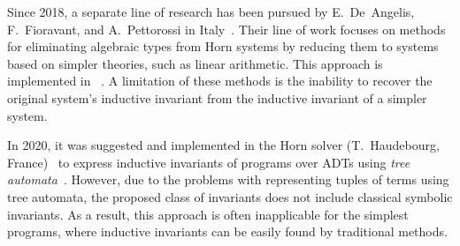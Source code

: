Since 2018, a separate line of research has been pursued by E.~De~Angelis, F.~Fioravant, and A.~Pettorossi in Italy~\cite{10.1093/logcom/exab090,pettorossi_proietti_2022,10.1007/978-3-030-51074-9_6,angelis_fioravanti_pettorossi_proietti_2018}. Their line of work focuses on methods for eliminating algebraic types from Horn systems by reducing them to systems based on simpler theories, such as linear arithmetic. This approach is implemented in \vericat{}~\cite{de_angelis_proietti_fioravanti_pettorossi_2022}. A limitation of these methods is the inability to recover the original system's inductive invariant from the inductive invariant of a simpler system.


In 2020, it was suggested and implemented in the \rchc{} Horn solver (T.~Haudebourg, France)~\cite{haude2020} to express inductive invariants of programs over ADTs using \emph{tree automata}~\cite{tata}. However, due to the problems with representing tuples of terms using tree automata, the proposed class of invariants does not include classical symbolic invariants. As a result, this approach is often inapplicable for the simplest programs, where inductive invariants can be easily found by traditional methods.

